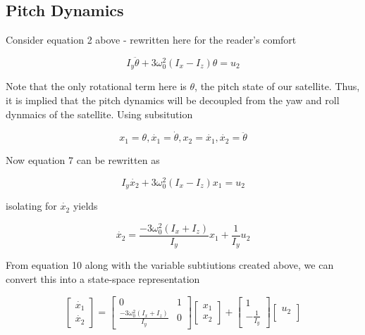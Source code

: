 \documentclass{article}
\begin{document}
\subsection{Pitch Dynamics}
Consider equation 2 above - rewritten here for the reader's comfort

\begin{equation}
I_{y}\ddot{\theta}+3\omega^{2}_{0}(I_{x}-I_{z})\theta = u_{2}
\end{equation}

Note that the only rotational term here is $\theta$, the pitch state of our satellite.
Thus, it is implied that the pitch dynamics will be decoupled from the yaw and roll dynmaics of the satellite.
Using subsitution

\begin{equation}
  x_1 = \theta,
  \dot{x_1} = \dot{\theta},
  x_2 = \dot{x_1},
  \dot{x_2} = \ddot{\theta}
\end{equation}

Now equation 7 can be rewritten as

\begin{equation}
I_{y}\dot{x_2}+3\omega^{2}_{0}(I_{x}-I_{z})x_1 = u_{2}
\end{equation}

isolating for $\dot{x_2}$ yields

\begin{equation}
\dot{x_2} = \frac{-3\omega^{2}_{0}(I_{x} + I_{z})}{I_y}x_1 + \frac{1}{I_y}u_{2}
\end{equation}


From equation 10 along with the variable subtiutions created above, we can convert this into a state-space representation

\begin{equation}
  \begin{bmatrix}
  \dot{x_1}  \\
  \dot{x_2}
\end{bmatrix}
  =
  \begin{bmatrix}
  0 & 1 \\
  \frac{-3\omega^{2}_{0}(I_{x} + I_{z})}{I_y} & 0
  \end{bmatrix}
  \begin{bmatrix}
  x_1  \\
  x_2
  \end{bmatrix}
  +
  \begin{bmatrix}
  1 \\
  -\frac{1}{I_y}
  \end{bmatrix}
  \begin{bmatrix}
  u_2 \\
  \end{bmatrix}

\end{equation}
\end{document}
